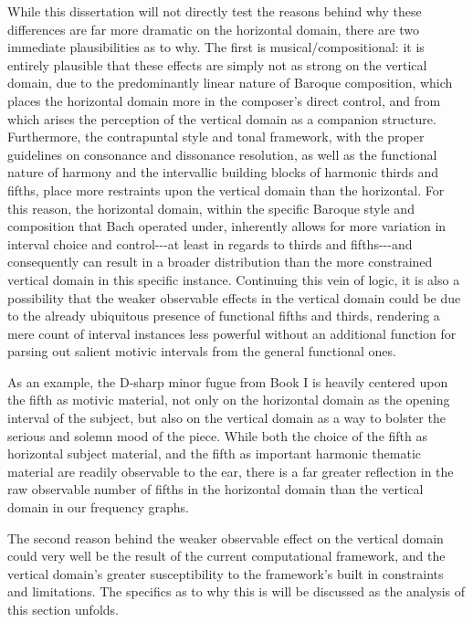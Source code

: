While this dissertation will not directly test the reasons behind why
these differences are far more dramatic on the horizontal domain, there
are two immediate plausibilities as to why. The first is
musical/compositional: it is entirely plausible that these effects are
simply not as strong on the vertical domain, due to the predominantly
linear nature of Baroque composition, which places the horizontal domain
more in the composer's direct control, and from which arises the
perception of the vertical domain as a companion structure. Furthermore,
the contrapuntal style and tonal framework, with the proper guidelines
on consonance and dissonance resolution, as well as the functional
nature of harmony and the intervallic building blocks of harmonic thirds
and fifths, place more restraints upon the vertical domain than the
horizontal. For this reason, the horizontal domain, within the specific
Baroque style and composition that Bach operated under, inherently
allows for more variation in interval choice and control-\/-\/-at least
in regards to thirds and fifths-\/-\/-and consequently can result in a
broader distribution than the more constrained vertical domain in this
specific instance. Continuing this vein of logic, it is also a
possibility that the weaker observable effects in the vertical domain
could be due to the already ubiquitous presence of functional fifths and
thirds, rendering a mere count of interval instances less powerful
without an additional function for parsing out salient motivic intervals
from the general functional ones.

As an example, the D-sharp minor fugue from Book I is heavily centered
upon the fifth as motivic material, not only on the horizontal domain as
the opening interval of the subject, but also on the vertical domain as
a way to bolster the serious and solemn mood of the piece. While both
the choice of the fifth as horizontal subject material, and the fifth as
important harmonic thematic material are readily observable to the ear,
there is a far greater reflection in the raw observable number of fifths
in the horizontal domain than the vertical domain in our frequency
graphs.

The second reason behind the weaker observable effect on the vertical
domain could very well be the result of the current computational
framework, and the vertical domain's greater susceptibility to the
framework's built in constraints and limitations. The specifics as to
why this is will be discussed as the analysis of this section unfolds.

